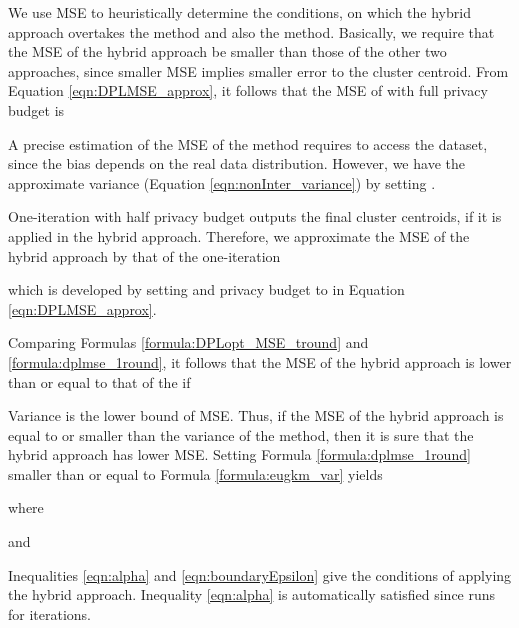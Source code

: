 We use MSE to heuristically determine the conditions, on which the hybrid approach overtakes the \dpl method and also the \eugkm method. Basically, we require that the MSE of the hybrid approach be smaller than those of the other two approaches, since smaller MSE implies smaller error to the cluster centroid.
From Equation \ref{eqn:DPLMSE_approx}, it follows that the MSE of \dpl with full privacy budget is

A precise estimation of the MSE of the \eugkm method requires to access the dataset, since the bias depends on the real data distribution. However, we have the approximate variance (Equation \ref{eqn:nonInter_variance}) by setting .

One-iteration \dpl with half privacy budget outputs the final  cluster centroids, if it is applied in the hybrid approach. Therefore, we approximate the MSE of the hybrid approach by that of the one-iteration \dpl

which is developed by setting  and privacy budget to  in Equation \ref{eqn:DPLMSE_approx}.

Comparing Formulas \ref{formula:DPLopt_MSE_tround} and \ref{formula:dplmse_1round}, it follows that the MSE of the hybrid approach is lower than or equal to that of the \dpl if


Variance is the lower bound of MSE. Thus, if the MSE of the hybrid approach is equal to or smaller than the variance of the \eugkm method, then it is sure that the hybrid approach has lower MSE. Setting Formula \ref{formula:dplmse_1round} smaller than or equal to Formula \ref{formula:eugkm_var} yields

where

and


Inequalities \ref{eqn:alpha} and \ref{eqn:boundaryEpsilon} give the conditions of applying the hybrid approach. Inequality \ref{eqn:alpha} is automatically satisfied since \dpl runs for  iterations.



\begin{comment}
\subsection{Improved Hybrid Approach}



Let 
 
and 



Optimze  over  by taking the first derivative of ,


Setting , we have 



Therefore,  has a global minimum. 

Two iterations case:







We have 

and 

therefore,  has a global minimum.  

\end{comment}



